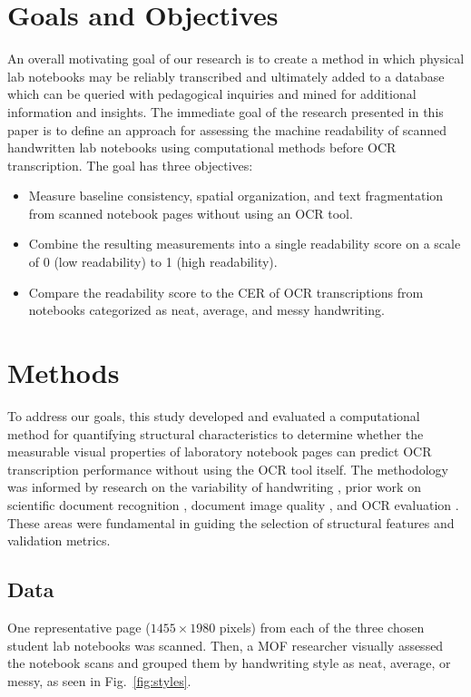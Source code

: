\documentclass[conference]{IEEEtran}
\begin{document}
\section{Goals and Objectives}
An overall motivating goal of our research is to create a method in which
physical lab notebooks may be reliably transcribed and ultimately added to a
database which can be queried with pedagogical inquiries and mined for
additional information and insights. The immediate goal of the research
presented in this paper is to define an approach for assessing the machine
readability of scanned handwritten lab notebooks using computational methods
before OCR transcription. The goal has three objectives:
\begin{itemize}
  \item Measure baseline consistency, spatial organization, and text
        fragmentation from scanned notebook pages without using an OCR tool.
  \item Combine the resulting measurements into a single readability score on a
        scale of 0 (low readability) to 1 (high readability).
  \item Compare the readability score to the CER of OCR transcriptions from
        notebooks categorized as neat, average, and messy handwriting.
\end{itemize}

\section{Methods}
\label{sec:methods}
To address our goals, this study developed and evaluated a computational method
for quantifying structural characteristics to determine whether the measurable
visual properties of laboratory notebook pages can predict OCR transcription
performance without using the OCR tool itself. The methodology was informed by
research on the variability of handwriting \cite{papavassiliou2010, rabaev2026},
prior work on scientific document recognition \cite{pepper2025}, document image
quality \cite{ye2013, alaei2024}, and OCR evaluation
\cite{smith2007, levenshtein1966}. These areas were fundamental in guiding the
selection of structural features and validation metrics.

\subsection{Data}
\label{sec:data}
One representative page ($1455 \times 1980$ pixels) from each of the three
chosen student lab notebooks was scanned. Then, a MOF researcher visually
assessed the notebook scans and grouped them by handwriting style as neat,
average, or messy, as seen in Fig.~\ref{fig:styles}.
\end{document}
